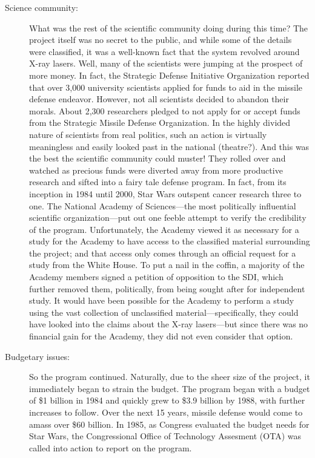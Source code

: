 \documentclass[12pt]{article}
\begin{document}
\begin{description}
\begin{description}
      \item[Science community:] What was the rest of the scientific community
        doing during this time? The project itself was no secret to the public,
        and while some of the details were classified, it was a well-known fact
        that the system revolved around X-ray lasers. Well, many of the
        scientists were jumping at the prospect of more money. In fact, the
        Strategic Defense Initiative Organization reported that over 3,000
        university scientists applied for funds to aid in the missile defense
        endeavor. However, not all scientists decided to abandon their morals.
        About 2,300 researchers pledged to not apply for or accept funds from
        the Strategic Missile Defense Organization. In the highly divided
        nature of scientists from real politics, such an action is virtually
        meaningless and easily looked past in the national (theatre?). And this
        was the best the scientific community could muster! They rolled over
        and watched as precious funds were diverted away from more productive
        research and sifted into a fairy tale defense program. In fact, from
        its inception in 1984 until 2000, Star Wars outspent cancer research
        three to one. The National Academy of Sciences---the most politically
        influential scientific organization---put out one feeble attempt to
        verify the credibility of the program. Unfortunately, the Academy
        viewed it as necessary for a study for the Academy to have access to
        the classified material surrounding the project; and that access only
        comes through an official request for a study from the White House. To
        put a nail in the coffin, a majority of the Academy members signed a
        petition of opposition to the SDI, which further removed them,
        politically, from being sought after for independent study. It would
        have been possible for the Academy to perform a study using the vast
        collection of unclassified material---specifically, they could have
        looked into the claims about the X-ray lasers---but since there was no
        financial gain for the Academy, they did not even consider that option.

      \item[Budgetary issues:] So the program continued. Naturally, due to the
        sheer size of the project, it immediately began to strain the budget.
        The program began with a budget of \$1 billion in 1984 and quickly grew
        to \$3.9 billion by 1988, with further increases to follow. Over the
        next 15 years, missile defense would come to amass over \$60 billion.
        In 1985, as Congress evaluated the budget needs for Star Wars, the
        Congressional Office of Technology Assesment (OTA) was called into
        action to report on the program. 

    \end{description}

\end{description}
\end{document}
